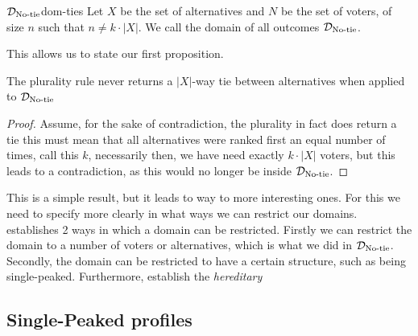 \begin{definition}{$\mathcal{D}_{\textnormal{No-tie}}$}{dom-ties}
	Let $X$ be the set of alternatives and $N$ be the set of voters, of size $n$ such that $n \neq k \cdot |X|$. We call the domain of all outcomes $\mathcal{D}_{\textnormal{No-tie}}$.
\end{definition}

This allows us to state our first proposition.

\begin{proposition}
	The plurality rule never returns a $|X|$-way tie between alternatives when applied to $\mathcal{D}_{\textnormal{No-tie}}$
\end{proposition}

\begin{proof}
	Assume, for the sake of contradiction, the plurality in fact does return a tie this must mean that all alternatives were ranked first an equal number of times, call this $k$, necessarily then, we have need exactly $k \cdot |X|$ voters, but this leads to a contradiction, as this would no longer be inside $\mathcal{D}_{\textnormal{No-tie}}$.
\end{proof}

This is a simple result, but it leads to way to more interesting ones. For this we need to specify more clearly in what ways we can restrict our domains. \citet{gaertnerChapter3Domain2002} establishes 2 ways in which a domain can be restricted. Firstly we can restrict the domain to a number of voters or alternatives, which is what we did in $\mathcal{D}_{\textnormal{No-tie}}$. Secondly, the domain can be restricted to have a certain structure, such as being single-peaked. Furthermore, \citet{elkindPreferenceRestrictionsComputational2022a} establish the \textit{hereditary}

\subsection{Single-Peaked profiles}
\label{sec: Single-peaked}




